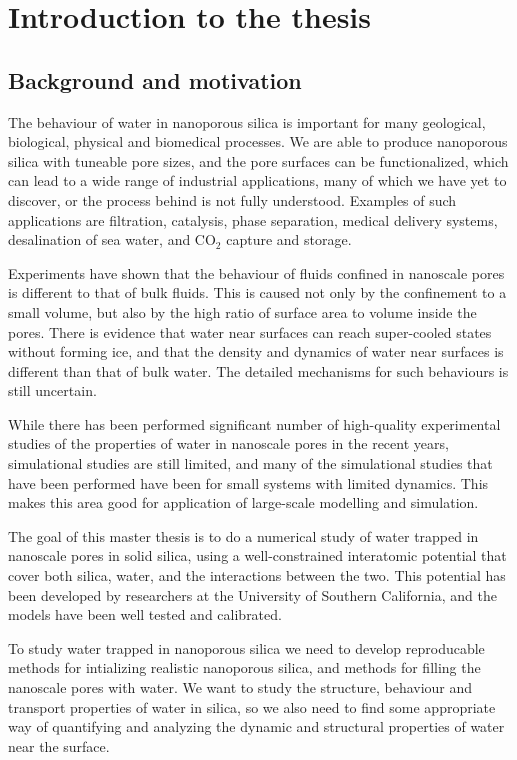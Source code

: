 \chapter*{Introduction to the thesis}%
%

\section*{Background and motivation}
%

The behaviour of water in nanoporous silica is important for many geological, biological, physical and biomedical processes. We are able to produce nanoporous silica with tuneable pore sizes, and the pore surfaces can be functionalized, which can lead to a wide range of industrial applications, many of which we have yet to discover, or the process behind is not fully understood. Examples of such applications are filtration, catalysis, phase separation, medical delivery systems, desalination of sea water, and CO$_2$ capture and storage.

Experiments have shown that the behaviour of fluids confined in nanoscale pores is different to that of bulk fluids. This is caused not only by the confinement to a small volume, but also by the high ratio of surface area to volume inside the pores. There is evidence that water near surfaces can reach super-cooled states without forming ice, and that the density and dynamics of water near surfaces is different than that of bulk water. The detailed mechanisms for such behaviours is still uncertain.

While there has been performed significant number of high-quality experimental studies of the properties of water in nanoscale pores in the recent years, simulational studies are still limited, and many of the simulational studies that have been performed have been for small systems with limited dynamics. This makes this area good for application of large-scale modelling and simulation.

The goal of this master thesis is to do a numerical study of water trapped in nanoscale pores in solid silica, using a well-constrained interatomic potential that cover both silica, water, and the interactions between the two. This potential has been developed by researchers at the University of Southern California, and the models have been well tested and calibrated.

To study water trapped in nanoporous silica we need to develop reproducable methods for intializing realistic nanoporous silica, and methods for filling the nanoscale pores with water. We want to study the structure, behaviour and transport properties of water in silica, so we also need to find some appropriate way of quantifying and analyzing the dynamic and structural properties of water near the surface.

